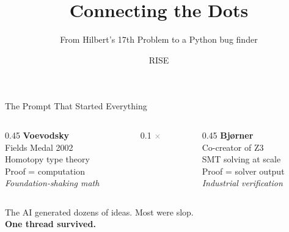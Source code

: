 \documentclass[aspectratio=169]{beamer}
\title{\textbf{Connecting the Dots}}
\subtitle{From Hilbert's 17th Problem to a Python bug finder}
\author{}
\date{RISE}
\begin{document}

\begin{frame}[plain]
\titlepage
\end{frame}


\begin{frame}{The Prompt That Started Everything}
\begin{center}
\end{center}

\vspace{0.8em}
\begin{columns}[c]
\begin{column}{0.45\textwidth}
\centering
\textcolor{hilbert}{\textbf{Voevodsky}}\\
\small Fields Medal 2002\\Homotopy type theory\\Proof = computation\\
\textit{Foundation-shaking math}
\end{column}
\begin{column}{0.1\textwidth}
\centering\Large\textcolor{gray}{$\times$}
\end{column}
\begin{column}{0.45\textwidth}
\centering
\textcolor{verify}{\textbf{Bj\o rner}}\\
\small Co-creator of Z3\\SMT solving at scale\\Proof = solver output\\
\textit{Industrial verification}
\end{column}
\end{columns}

\vspace{0.8em}
\centering
The AI generated dozens of ideas. Most were slop.\\[4pt]
\textbf{One thread survived.}
\end{frame}
\end{document}

